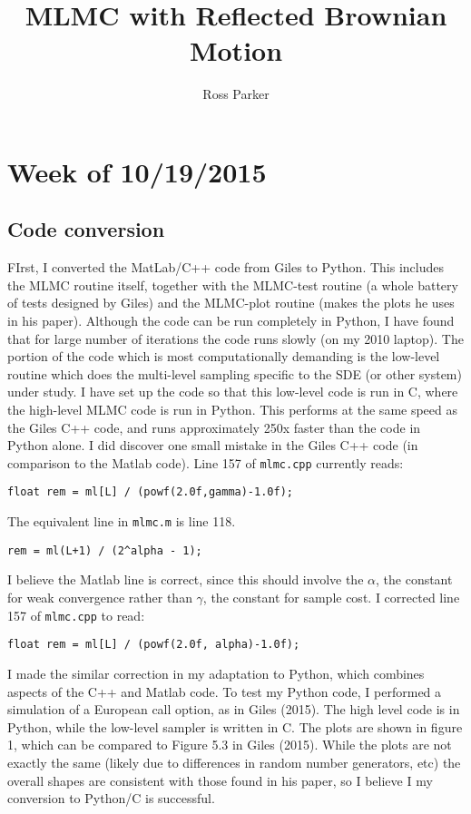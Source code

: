 \documentclass[]{article}
\theoremstyle{definition}
\theoremstyle{remark}
\begin{document}
\title{MLMC with Reflected Brownian Motion}
\author{Ross Parker}
\maketitle

\section{Week of 10/19/2015}
\subsection{Code conversion}
FIrst, I converted the MatLab/C++ code from Giles to Python. This includes the MLMC routine itself, together with the MLMC-test routine (a whole battery of tests designed by Giles) and the MLMC-plot routine (makes the plots he uses in his paper). Although the code can be run completely in Python, I have found that for large number of iterations the code runs slowly (on my 2010 laptop). The portion of the code which is most computationally demanding is the low-level routine which does the multi-level sampling specific to the SDE (or other system) under study. I have set up the code so that this low-level code is run in C, where the high-level MLMC code is run in Python. This performs at the same speed as the Giles C++ code, and runs approximately 250x faster than the code in Python alone. I did discover one small mistake in the Giles C++ code (in comparison to the Matlab code). Line 157 of \texttt{mlmc.cpp} currently reads:
\begin{verbatim}
float rem = ml[L] / (powf(2.0f,gamma)-1.0f);
\end{verbatim}
The equivalent line in \texttt{mlmc.m} is line 118.
\begin{verbatim}
rem = ml(L+1) / (2^alpha - 1);
\end{verbatim}
I believe the Matlab line is correct, since this should involve the $\alpha$, the constant for weak convergence rather than $\gamma$, the constant for sample cost. I corrected line 157 of \texttt{mlmc.cpp} to read:
\begin{verbatim}
float rem = ml[L] / (powf(2.0f, alpha)-1.0f);
\end{verbatim}
I made the similar correction in my adaptation to Python, which combines aspects of the C++ and Matlab code. To test my Python code, I performed a simulation of a European call option, as in Giles (2015). The high level code is in Python, while the low-level sampler is written in C. The plots are shown in figure 1, which can be compared to Figure 5.3 in Giles (2015). While the plots are not exactly the same (likely due to differences in random number generators, etc) the overall shapes are consistent with those found in his paper, so I believe I my conversion to Python/C is successful.
\end{document}
